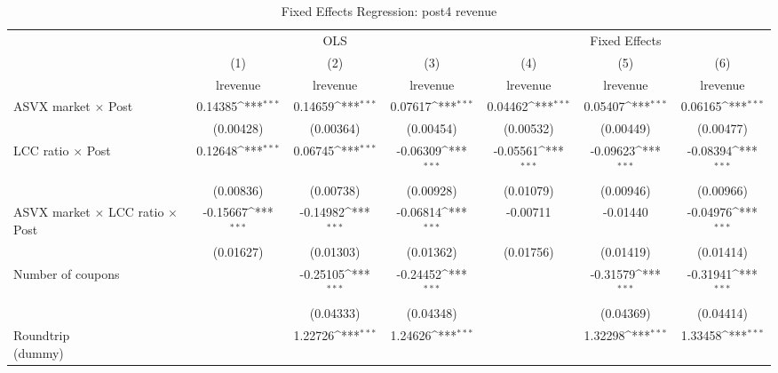\begin{table}[htbp]\centering
\def\sym#1{\ifmmode^{#1}\else\(^{#1}\)\fi}
\caption{Fixed Effects Regression: post4 revenue}
\begin{tabular}{l*{6}{c}}
\toprule
                    &\multicolumn{3}{c}{OLS}                                          &\multicolumn{3}{c}{Fixed Effects}                                \\\cmidrule(lr){2-4}\cmidrule(lr){5-7}
                    &\multicolumn{1}{c}{(1)}&\multicolumn{1}{c}{(2)}&\multicolumn{1}{c}{(3)}&\multicolumn{1}{c}{(4)}&\multicolumn{1}{c}{(5)}&\multicolumn{1}{c}{(6)}\\
                    &\multicolumn{1}{c}{lrevenue}&\multicolumn{1}{c}{lrevenue}&\multicolumn{1}{c}{lrevenue}&\multicolumn{1}{c}{lrevenue}&\multicolumn{1}{c}{lrevenue}&\multicolumn{1}{c}{lrevenue}\\
\midrule
ASVX market $\times$ Post&     0.14385\sym{***}&     0.14659\sym{***}&     0.07617\sym{***}&     0.04462\sym{***}&     0.05407\sym{***}&     0.06165\sym{***}\\
                    &   (0.00428)         &   (0.00364)         &   (0.00454)         &   (0.00532)         &   (0.00449)         &   (0.00477)         \\
\addlinespace
LCC ratio $\times$ Post&     0.12648\sym{***}&     0.06745\sym{***}&    -0.06309\sym{***}&    -0.05561\sym{***}&    -0.09623\sym{***}&    -0.08394\sym{***}\\
                    &   (0.00836)         &   (0.00738)         &   (0.00928)         &   (0.01079)         &   (0.00946)         &   (0.00966)         \\
\addlinespace
ASVX market $\times$ LCC ratio $\times$ Post&    -0.15667\sym{***}&    -0.14982\sym{***}&    -0.06814\sym{***}&    -0.00711         &    -0.01440         &    -0.04976\sym{***}\\
                    &   (0.01627)         &   (0.01303)         &   (0.01362)         &   (0.01756)         &   (0.01419)         &   (0.01414)         \\
\addlinespace
Number of coupons   &                     &    -0.25105\sym{***}&    -0.24452\sym{***}&                     &    -0.31579\sym{***}&    -0.31941\sym{***}\\
                    &                     &   (0.04333)         &   (0.04348)         &                     &   (0.04369)         &   (0.04414)         \\
\addlinespace
\shortstack{Roundtrip \\ (dummy)}&                     &     1.22726\sym{***}&     1.24626\sym{***}&                     &     1.32298\sym{***}&     1.33458\sym{***}\\

\end{tabular}
\end{table}
